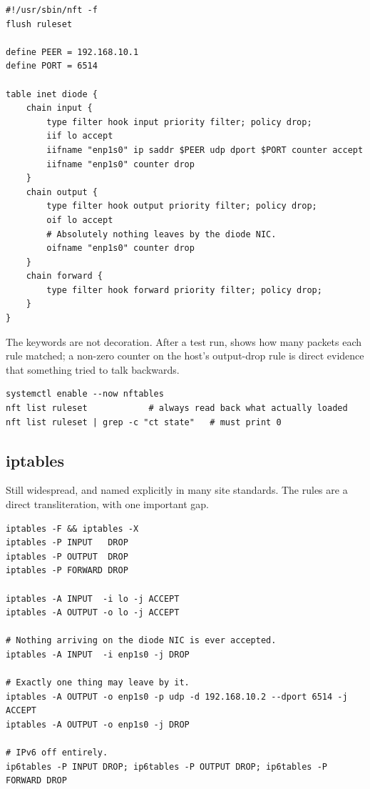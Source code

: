 \documentclass[11pt,a4paper]{article}
\begin{document}
\begin{lstlisting}[style=nft,caption={\file{/etc/nftables.conf} --- DESTINATION host (receive only)}]
#!/usr/sbin/nft -f
flush ruleset

define PEER = 192.168.10.1
define PORT = 6514

table inet diode {
    chain input {
        type filter hook input priority filter; policy drop;
        iif lo accept
        iifname "enp1s0" ip saddr $PEER udp dport $PORT counter accept
        iifname "enp1s0" counter drop
    }
    chain output {
        type filter hook output priority filter; policy drop;
        oif lo accept
        # Absolutely nothing leaves by the diode NIC.
        oifname "enp1s0" counter drop
    }
    chain forward {
        type filter hook forward priority filter; policy drop;
    }
}
\end{lstlisting}

The  keywords are not decoration. After a test run,
 shows how many packets each rule matched; a non-zero
counter on the \dstside{} host's output-drop rule is direct evidence that
something tried to talk backwards.

\begin{lstlisting}[style=shell]
systemctl enable --now nftables
nft list ruleset            # always read back what actually loaded
nft list ruleset | grep -c "ct state"   # must print 0
\end{lstlisting}

\subsection{iptables}

Still widespread, and named explicitly in many site standards. The rules are
a direct transliteration, with one important gap.

\begin{lstlisting}[style=shell,caption={SOURCE host}]
iptables -F && iptables -X
iptables -P INPUT   DROP
iptables -P OUTPUT  DROP
iptables -P FORWARD DROP

iptables -A INPUT  -i lo -j ACCEPT
iptables -A OUTPUT -o lo -j ACCEPT

# Nothing arriving on the diode NIC is ever accepted.
iptables -A INPUT  -i enp1s0 -j DROP

# Exactly one thing may leave by it.
iptables -A OUTPUT -o enp1s0 -p udp -d 192.168.10.2 --dport 6514 -j ACCEPT
iptables -A OUTPUT -o enp1s0 -j DROP

# IPv6 off entirely.
ip6tables -P INPUT DROP; ip6tables -P OUTPUT DROP; ip6tables -P FORWARD DROP
\end{lstlisting}
\end{document}
